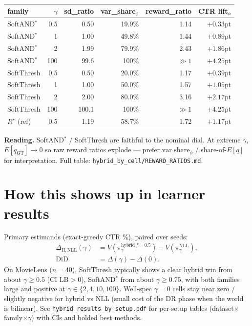 \documentclass[11pt,a4paper]{article}
\begin{document}
\begin{center}\small
\begin{tabular}{lrrrrr}
\toprule
family & $\gamma$ & sd\_ratio & var\_share$_\phi$ & reward\_ratio & CTR lift$_\phi$ \\
\midrule
SoftAND$^*$ & 0.5 & 0.50 & 19.9\% & 1.14 & $+0.33$pt \\
SoftAND$^*$ & 1 & 1.00 & 49.8\% & 1.44 & $+0.89$pt \\
SoftAND$^*$ & 2 & 1.99 & 79.9\% & 2.43 & $+1.86$pt \\
SoftAND$^*$ & 100 & 99.6 & 100\% & $\gg 1$ & $+4.25$pt \\
\midrule
SoftThresh & 0.5 & 0.50 & 20.0\% & 1.17 & $+0.39$pt \\
SoftThresh & 1 & 1.00 & 50.0\% & 1.57 & $+1.05$pt \\
SoftThresh & 2 & 2.00 & 80.0\% & 3.16 & $+2.17$pt \\
SoftThresh & 100 & 100.1 & 100\% & $\gg 1$ & $+4.25$pt \\
\midrule
$R^\star$ (ref) & 0.5 & 1.19 & 58.7\% & 1.72 & $+1.17$pt \\
\bottomrule
\end{tabular}
\end{center}

\noindent
\textbf{Reading.} SoftAND$^*$ / SoftThresh are faithful to the nominal dial.
At extreme $\gamma$, $E[q_{\mathrm{GT}}]\to 0$ so raw reward ratios explode ---
prefer $\mathrm{var\_share}_\phi$ / share-of-$E[q]$ for interpretation.
Full table: \texttt{hybrid\_by\_cell/REWARD\_RATIOS.md}.

\section{How this shows up in learner results}

Primary estimands (exact-greedy CTR \%), paired over seeds:
\begin{align}
\Delta_{\mathrm{H},\mathrm{NLL}}(\gamma)
&=
V(\pi^{\mathrm{hybrid}\,f{=}0.5}_\gamma)-V(\pi^{\mathrm{NLL}}_\gamma),
\\
\mathrm{DiD}
&=
\Delta(\gamma)-\Delta(0).
\end{align}
On MovieLens ($n{=}40$), SoftThresh typically shows a clear hybrid win from about
$\gamma\ge 0.5$ (CI LB$>0$), SoftAND$^*$ from about $\gamma\ge 0.75$, with both
families large and positive at $\gamma\in\{2,4,10,100\}$.
Well-spec $\gamma{=}0$ cells stay near zero / slightly negative for hybrid vs NLL
(small cost of the DR phase when the world is bilinear).
See \texttt{hybrid\_results\_by\_setup.pdf} for per-setup tables
(dataset$\times$family$\times\gamma$) with CIs and bolded best methods.
\end{document}

